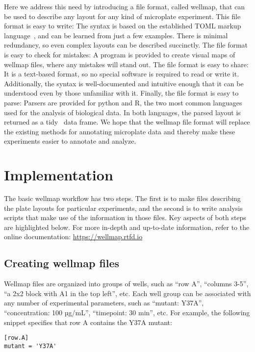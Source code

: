 \documentclass[twocolumn]{bmcart}
\begin{document}
Here we address this need by introducing a file format, called wellmap, that
can be used to describe any layout for any kind of microplate experiment. This
file format is easy to write: The syntax is based on the established TOML
markup language~\cite{preston-werner2020}, and can be learned from just a few
examples. There is minimal redundancy, so even complex layouts can be described
succinctly. The file format is easy to check for mistakes: A program is
provided to create visual maps of wellmap files, where any mistakes will stand
out. The file format is easy to share: It is a text-based format, so no special
software is required to read or write it. Additionally, the syntax is
well-documented and intuitive enough that it can be understood even by those
unfamiliar with it. Finally, the file format is easy to parse: Parsers are
provided for python and R, the two most common languages used for the analysis
of biological data. In both languages, the parsed layout is returned as a
tidy~\cite{wickham2014} data frame. We hope that the wellmap file format will
replace the existing methods for annotating microplate data and thereby make
these experiments easier to annotate and analyze.

\section*{Implementation}

The basic wellmap workflow has two steps. The first is to make files describing
the plate layouts for particular experiments, and the second is to write
analysis scripts that make use of the information in those files. Key aspects
of both steps are highlighted below. For more in-depth and up-to-date
information, refer to the online documentation: \url{https://wellmap.rtfd.io} 

\subsection*{Creating wellmap files}

Wellmap files are organized into groups of wells, such as ``row A'', ``columns
3-5'', ``a 2x2 block with A1 in the top left'', etc.  Each well group can be
associated with any number of experimental parameters, such as ``mutant:
Y37A'', ``concentration: 100 µg/mL'', ``timepoint: 30 min'', etc. For example,
the following snippet specifies that row A contains the Y37A
mutant:

\begin{lstlisting}
[row.A]
mutant = 'Y37A'
\end{lstlisting}
\end{document}

